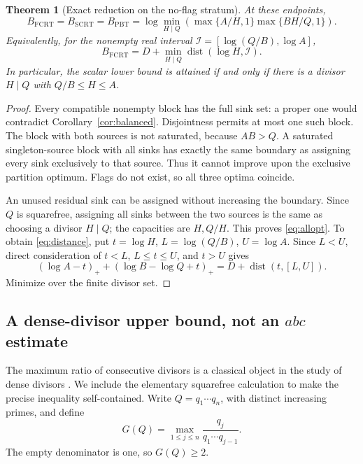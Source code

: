 \documentclass[11pt]{article}
\newtheorem{theorem}{Theorem}[section]
\theoremstyle{definition}\newtheorem{definition}[theorem]{Definition}
\theoremstyle{remark}\newtheorem{remark}[theorem]{Remark}
\newcommand{\dist}{\operatorname{dist}}
\newcommand{\FCRT}{\mathrm{FCRT}}
\newcommand{\SCRT}{\mathrm{SCRT}}
\newcommand{\PBT}{\mathrm{PBT}}
\begin{document}
\begin{theorem}[Exact reduction on the no-flag stratum]\label{thm:reduction}
At these endpoints,
\begin{equation}\label{eq:allopt}
 B_{\FCRT}=B_{\SCRT}=B_{\PBT}
 =\log\min_{H\mid Q}\left(\max\{A/H,1\}\max\{BH/Q,1\}\right).
\end{equation}
Equivalently, for the nonempty real interval
\(\mathcal I=[\log(Q/B),\log A]\),
\begin{equation}\label{eq:distance}
 B_{\FCRT}=D+\min_{H\mid Q}\dist(\log H,\mathcal I).
\end{equation}
In particular, the scalar lower bound is attained if and only if there is
a divisor \(H\mid Q\) with \(Q/B\le H\le A\).
\end{theorem}
\begin{proof}
Every compatible nonempty block has the full sink set: a proper one would
contradict Corollary~\ref{cor:balanced}. Disjointness permits at most one
such block. The block with both sources is not saturated, because \(AB>Q\).
A saturated singleton-source block with all sinks has exactly the same
boundary as assigning every sink exclusively to that source. Thus it cannot
improve upon the exclusive partition optimum. Flags do not exist, so all
three optima coincide.

An unused residual sink can be assigned without increasing the boundary.
Since \(Q\) is squarefree, assigning all sinks between the two sources is
the same as choosing a divisor \(H\mid Q\); the capacities are \(H,Q/H\).
This proves \eqref{eq:allopt}. To obtain \eqref{eq:distance}, put
\(t=\log H\), \(L=\log(Q/B)\), \(U=\log A\). Since \(L<U\), direct
consideration of \(t<L\), \(L\le t\le U\), and \(t>U\) gives
\[
 (\log A-t)_++(\log B-\log Q+t)_+
       =D+\dist(t,[L,U]).
\]
Minimize over the finite divisor set.
\end{proof}

\subsection{A dense-divisor upper bound, not an \(abc\) estimate}
The maximum ratio of consecutive divisors is a classical object in the
study of dense divisors \cite{weingartner}. We include the elementary
squarefree calculation to make the precise inequality self-contained.
Write \(Q=q_1\cdots q_n\), with distinct increasing primes, and define
\[
 G(Q)=\max_{1\le j\le n}\frac{q_j}{q_1\cdots q_{j-1}}.
\]
The empty denominator is one, so \(G(Q)\ge2\).
\end{document}
